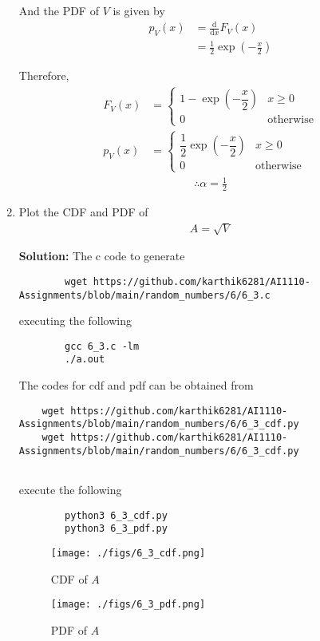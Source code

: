 \documentclass[journal,12pt,twocolumn]{IEEEtran}
\newcommand{\solution}{\noindent \textbf{Solution: }}
\providecommand{\brak}[1]{\ensuremath{\left(#1\right)}}
\providecommand{\der}[1]{\mathrm{d} #1}
\numberwithin{equation}{section}
\renewcommand\thesection{\arabic{section}}
\begin{document}
\begin{enumerate}[label=\thesection.\arabic*,ref=\thesection.\theenumi]
	And the PDF of $V$ is given by
	\begin{align}
		p_V(x) &= \frac{\der{}}{\der{x}} F_V(x) \\
		&= \frac12 \exp\brak{-\frac{x}{2}} 
	\end{align}
	
	Therefore,
	\begin{align}
		F_V(x) &= 
		\begin{cases}
			1 - \exp\brak{-\dfrac{x}{2}} & x \geq 0 \\
			0 & \text{otherwise}
		\end{cases}	\\
		p_V(x) &= 
		\begin{cases}
			\dfrac12 \exp\brak{-\dfrac{x}{2}} & x \geq 0 \\
			0 & \text{otherwise}
		\end{cases}
	\end{align}
	\begin{align}
		\therefore \alpha = \frac12
	\end{align}
	
	\item Plot the CDF and PDF of
	\begin{align}
		A = \sqrt{V}
	\end{align}
	
	\solution The c code to generate 
	\begin{lstlisting}
		wget https://github.com/karthik6281/AI1110-Assignments/blob/main/random_numbers/6/6_3.c
	\end{lstlisting}
	executing the following
	\begin{lstlisting}
		gcc 6_3.c -lm
		./a.out
	\end{lstlisting}
	
	The codes for cdf and pdf can be obtained from
	\begin{lstlisting}
	wget https://github.com/karthik6281/AI1110-Assignments/blob/main/random_numbers/6/6_3_cdf.py
	wget https://github.com/karthik6281/AI1110-Assignments/blob/main/random_numbers/6/6_3_cdf.py
	
	\end{lstlisting}
	execute the following
	\begin{lstlisting}
		python3 6_3_cdf.py
		python3 6_3_pdf.py
	\end{lstlisting}
	\begin{figure}
		\centering
		\texttt{[image: ./figs/6\_3\_cdf.png]}
		\caption{CDF of $A$}
		\label{fig-6.3}
	\end{figure}
	\begin{figure}
		\centering
		\texttt{[image: ./figs/6\_3\_pdf.png]}
		\caption{PDF of $A$}
		\label{fig-6.4}
	\end{figure}
	

\end{enumerate}
\end{document}
